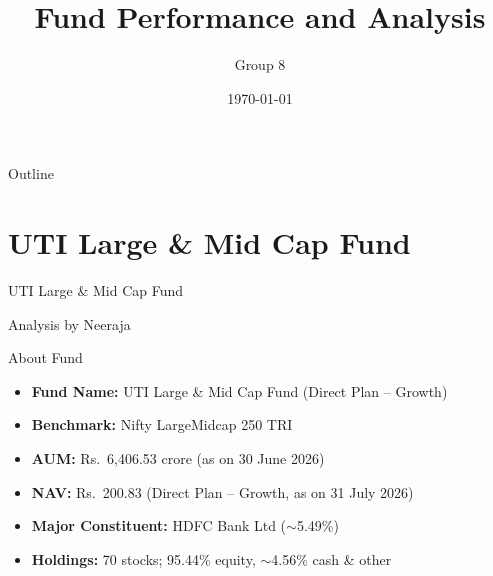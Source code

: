 \documentclass[11pt, aspectratio=43]{beamer}
\title[MS5610 Presentation]{Fund Performance and Analysis}
\author{Group 8}
\date{\today}
\begin{document}
\begin{frame}
    \titlepage
\end{frame}

\begin{frame}{Outline}
    \tableofcontents
\end{frame}

\section{UTI Large \& Mid Cap Fund} %

\begin{frame}{}
\centering
\vspace{2em}
{\huge UTI Large \& Mid Cap Fund}

\vspace{1.5em}
{\large Analysis by Neeraja}
 
\end{frame}

\begin{frame}{About Fund}
\begin{itemize}
    \item \textbf{Fund Name:} UTI Large \& Mid Cap Fund (Direct Plan -- Growth)
    \item \textbf{Benchmark:} Nifty LargeMidcap 250 TRI
    \item \textbf{AUM:} Rs.\ 6,406.53 crore (as on 30 June 2026)
    \item \textbf{NAV:} Rs.\ 200.83 (Direct Plan -- Growth, as on 31 July 2026)
    \item \textbf{Major Constituent:} HDFC Bank Ltd ($\sim$5.49\%)
    \item \textbf{Holdings:} 70 stocks; 95.44\% equity, $\sim$4.56\% cash \& other
\end{itemize}
\end{frame}
\end{document}
